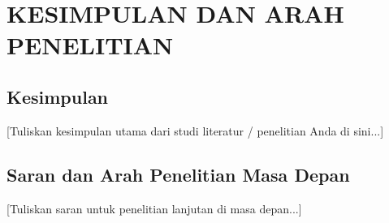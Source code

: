 \section{KESIMPULAN DAN ARAH PENELITIAN}
\label{sec:kesimpulan}

\subsection{Kesimpulan}
[Tuliskan kesimpulan utama dari studi literatur / penelitian Anda di sini...]

\subsection{Saran dan Arah Penelitian Masa Depan}
[Tuliskan saran untuk penelitian lanjutan di masa depan...]
